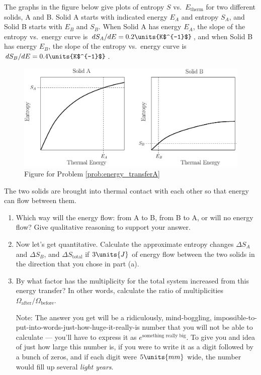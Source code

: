 \begin{problem}
The graphs in the figure below give plots of entropy $S$ vs.\ $E_\text{therm}$ for
two different solids, A and B.  Solid A starts with indicated energy $E_A$ and 
entropy $S_A$, and Solid B starts with $E_B$ and $S_B$.  
When Solid A has energy $E_A$, the slope of the entropy 
vs.\ energy curve is $dS_A/dE= 0.2\units{K$^{-1}$}$, and 
when Solid B has energy $E_B$, the slope of the entropy vs.\ energy 
curve is $dS_B/dE = 0.4\units{K$^{-1}$}$.

\begin{figure}[h]
\begin{center}
\includegraphics[width=5.0in]{second_law_and_entropy/energy_transferA.eps}
\caption{Figure for Problem \ref{prob:energy_transferA}}
\label{fig:energy_transferA}
\end{center}
\end{figure}

The two solids are brought into thermal contact with each other so that
energy can flow between them.
\begin{enumerate}
\item Which way will the energy flow:  from A to B, from B to A, or 
will no energy flow?  Give  qualitative reasoning to support your answer.
\item Now let's get quantitative.  Calculate the approximate  
entropy changes $\Delta S_A$ and $\Delta S_B$, and $\Delta S_\text{total}$ 
if $3\units{J}$ of energy flow between the two solids in the direction 
that you chose in part (a).  
\item By what factor has the multiplicity for the total system increased
from this energy transfer?  In other words, calculate the ratio of 
multiplicities $\Omega_\text{after}/\Omega_\text{before}$.

Note:  The answer you get will be a ridiculously, mind-boggling,
impossible-to-put-into-words-just-how-huge-it-really-is number
that you will not be able to calculate ---  you'll have to express it as
$e^\text{something really big}$.  To give you and idea of just how
large this number is, if you were to write it as a digit followed by a
bunch of zeros, and if each digit were $5\units{mm}$ wide, the number
would fill up several {\em light years}.


\end{enumerate}
\end{problem}
